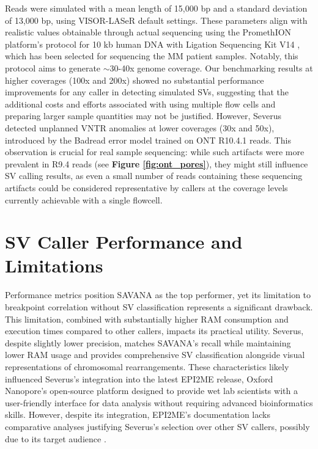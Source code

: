 Reads were simulated with a mean length of 15,000 bp and a standard deviation of 
13,000 bp, using VISOR-LASeR default settings. These parameters align with 
realistic values obtainable through actual sequencing using the PromethION 
platform's protocol for 10 kb human DNA with Ligation Sequencing Kit V14 
\cite{noauthor_ligation_2022}, which has been selected for sequencing the MM
patient samples. Notably, this protocol aims to generate $\sim$30-40x genome 
coverage. Our benchmarking results at higher coverages (100x and 200x) showed 
no substantial performance improvements for any caller in detecting simulated 
SVs, suggesting that the additional costs and efforts associated with using 
multiple flow cells and preparing larger sample quantities may not be justified. 
However, Severus detected unplanned VNTR anomalies at lower coverages (30x and 50x), 
introduced by the Badread error model trained on ONT R10.4.1 reads. This 
observation is crucial for real sample sequencing: while such artifacts were 
more prevalent in R9.4 reads (see \textbf{Figure \ref{fig:ont_pores}}), 
they might still influence SV calling results, as even a small number of reads 
containing these sequencing artifacts could be considered representative by 
callers at the coverage levels currently achievable with a single flowcell.

\section{SV Caller Performance and Limitations}

Performance metrics position SAVANA as the top performer, yet its limitation to 
breakpoint correlation without SV classification represents a significant 
drawback. This limitation, combined with substantially higher RAM consumption 
and execution times compared to other callers, impacts its practical utility. 
Severus, despite slightly lower precision, matches SAVANA's recall while 
maintaining lower RAM usage and provides comprehensive SV classification 
alongside visual representations of chromosomal rearrangements. These 
characteristics likely influenced Severus's integration into the latest EPI2ME 
release, Oxford Nanopore's open-source platform designed to provide wet lab 
scientists with a user-friendly interface for data analysis without requiring 
advanced bioinformatics skills. However, despite its integration, EPI2ME's 
documentation lacks comparative analyses justifying Severus's selection over 
other SV callers, possibly due to its target audience 
\cite{oxford_nanopore_technologies_epi2me_nodate}.

